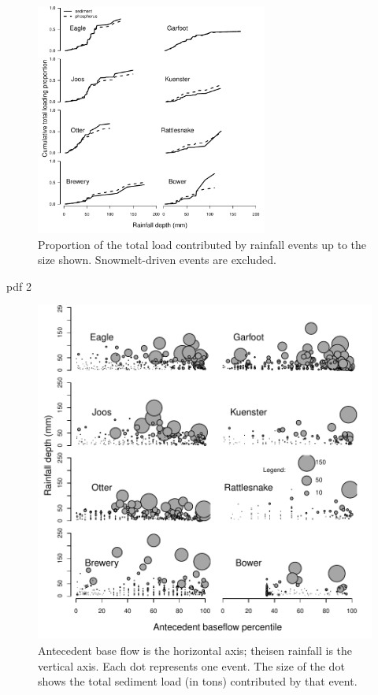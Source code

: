 \documentclass[10pt]{article}
\begin{document}
\begin{figure}
    \begin{center}
    \includegraphics[width=3in]{figure2}
    \end{center}
    \caption{Proportion of the total load contributed by rainfall events up to the size shown. Snowmelt-driven events are excluded.\label{cdf}}
\end{figure}


\begin{Schunk}
\begin{Soutput}
pdf 
  2 
\end{Soutput}
\end{Schunk}

\begin{figure}
    \begin{center}
    \includegraphics[width=3inches]{stot_bubbles}
    \end{center}
    \caption{Antecedent base flow is the horizontal axis; theisen rainfall is the vertical axis. Each dot represents one event. The size of the dot shows the total sediment load (in tons) contributed by that event. \label{sed_bubbles}}
\end{figure}
\end{document}
